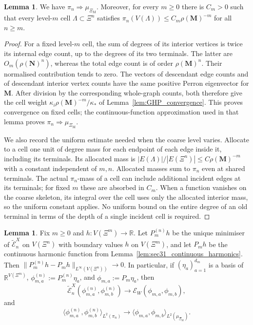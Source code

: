 \documentclass{article}
\theoremstyle{plain}
\theoremstyle{definition}
\newtheorem{lemma}[theorem]{Lemma}
\begin{document}
\begin{lemma}\label{lem:sec31_speed_measure}
We have $\pi_n\Rightarrow \mu_{\Xi_{\mathrm M}}$.
Moreover, for every $m\ge 0$ there is $C_m>0$ such that every level-$m$ cell $\Lambda\subset \Xi^n$ satisfies $\pi_n(V(\Lambda))\le C_m\rho(\mathbf M)^{-m}$ for all $n\ge m$.
\end{lemma}

\begingroup\color{red}
\begin{proof}
For a fixed level-$m$ cell, the sum of degrees of its interior vertices is
twice its internal edge count, up to the degrees of its two terminals.
The latter are $O_m(\rho(\mathbf N)^n)$, whereas the total edge count is
of order $\rho(\mathbf M)^n$. Their normalised contribution tends to zero.
The vectors of descendant edge counts and of descendant interior vertex
counts have the same positive Perron eigenvector for $\mathbf M$.
After division by the corresponding whole-graph counts, both therefore
give the cell weight $\kappa_i\rho(\mathbf M)^{-m}/\kappa_*$ of
Lemma~\ref{lem:GHP_convergence}. This proves convergence on fixed cells;
the continuous-function approximation used in that lemma proves
$\pi_n\Rightarrow\mu_{\Xi_{\mathrm M}}$.

We also record the uniform estimate needed when the coarse level varies.
Allocate to a cell one unit of degree mass for each endpoint of each edge
inside it, including its terminals. Its allocated mass is
$|E(\Lambda)|/|E(\Xi^n)|\le C\rho(\mathbf M)^{-m}$ with a constant
independent of $m,n$. Allocated masses sum to $\pi_n$ even at shared
terminals. The actual $\pi_n$-mass of a cell can include additional
incident edges at its terminals; for fixed $m$ these are absorbed in
$C_m$. When a function vanishes on the coarse skeleton, its integral
over the cell uses only the allocated interior mass, so the uniform
constant applies. No uniform bound on the entire degree of an old
terminal in terms of the depth of a single incident cell is required.
\end{proof}
\endgroup{}


\begin{lemma}\label{lem:sec31_discrete_harmonics}
Fix $m\ge 0$ and $h:V(\Xi^m)\to\mathbb R$.
Let $P_m^{(n)}h$ be the unique minimiser of $\widetilde{\mathcal E}_n^{X}$ on $V(\Xi^n)$ with boundary values $h$ on $V(\Xi^m)$, and let $P_mh$ be the continuous harmonic function from Lemma~\ref{lem:sec31_continuous_harmonics}.
Then $\|P_m^{(n)}h-P_mh\|_{L^\infty(V(\Xi^n))}\to 0$.
In particular, if $(\eta_a)_{a=1}^{d_m}$ is a basis of $\mathbb R^{V(\Xi^m)}$, $\phi_{m,a}^{(n)}:=P_m^{(n)}\eta_a$, and $\phi_{m,a}:=P_m\eta_a$, then
\[
\widetilde{\mathcal E}_n^{X}(\phi_{m,a}^{(n)},\phi_{m,b}^{(n)})
\to
\mathcal E_W(\phi_{m,a},\phi_{m,b}),
\]
and
\[
\langle \phi_{m,a}^{(n)},\phi_{m,b}^{(n)}\rangle_{L^2(\pi_n)}
\to
\langle \phi_{m,a},\phi_{m,b}\rangle_{L^2(\mu_{\Xi_{\mathrm M}})}.
\]
\end{lemma}
\end{document}
